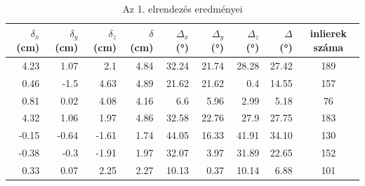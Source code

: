 

\setlength\tabcolsep{6pt}
\begin{table}[H]
\centering
\begin{tabular}{|rrr|r|rrr|r|c|}
\hline 
$\delta_x$ (cm) & $\delta_y$ (cm) & $\delta_z$ (cm) & $\delta$ (cm) & $\Delta_x$ (°) & $\Delta_y$ (°) & $\Delta_z$ (°) & $\Delta$ (°) & inlierek száma \\ \hline
4.23&	1.07&	2.1&	4.84&	32.24&	21.74&	28.28&	27.42&	189\\
0.46&	-1.5&	4.63&	4.89&	21.62&	21.62&	0.4&	14.55&	157\\
0.81&	0.02&	4.08&	4.16&	6.6&	5.96&	2.99&	5.18&	76\\
4.32&	1.06&	1.97&	4.86&	32.58&	22.76&	27.9&	27.75&	183\\
-0.15&	-0.64&	-1.61&	1.74&	44.05&	16.33&	41.91&	34.10&	130\\
-0.38&	-0.3&	-1.91&	1.97&	32.07&	3.97&	31.89&	22.65&	152\\
0.33&	0.07&	2.25&	2.27&	10.13&	0.37&	10.14&	6.88&	101 \\
\hline
\end{tabular}
\caption{Az 1. elrendezés eredményei}
\end{table}

